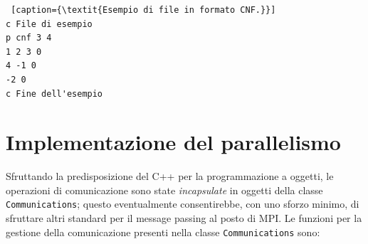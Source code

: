 \documentclass[12pt, a4paper, twosides]{report}
\begin{document}
\vspace*{10pt}
\begin{lstlisting} [caption={\textit{Esempio di file in formato CNF.}}]
c File di esempio
p cnf 3 4
1 2 3 0
4 -1 0
-2 0
c Fine dell'esempio
\end{lstlisting}





\section{Implementazione del parallelismo}

Sfruttando la predisposizione del C++ per la programmazione a oggetti, le operazioni di comunicazione sono state \textit{incapsulate} in oggetti della classe \verb|Communications|; questo eventualmente consentirebbe, con uno sforzo minimo, di sfruttare altri standard per il message passing al posto di MPI. Le funzioni per la gestione della comunicazione presenti nella classe \verb|Communications| sono:
\end{document}
